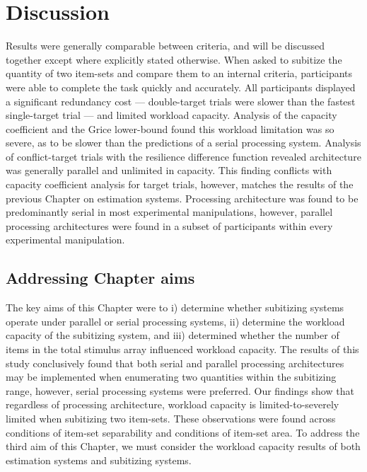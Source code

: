 \section{Discussion}
Results were generally comparable between criteria, and will be discussed together except where explicitly stated otherwise. When asked to subitize the quantity of two item-sets and compare them to an internal criteria, participants were able to complete the task quickly and accurately. All participants displayed a significant redundancy cost --- double-target trials were slower than the fastest single-target trial --- and limited workload capacity. Analysis of the capacity coefficient and the Grice lower-bound found this workload limitation was so severe, as to be slower than the predictions of a serial processing system. Analysis of conflict-target trials with the resilience difference function revealed architecture was generally parallel and unlimited in capacity. This finding conflicts with capacity coefficient analysis for target trials, however, matches the results of the previous Chapter on estimation systems. Processing architecture was found to be predominantly serial in most experimental manipulations, however, parallel processing architectures were found in a subset of participants within every experimental manipulation.


\subsection{Addressing Chapter aims}
The key aims of this Chapter were to i) determine whether subitizing systems operate under parallel or serial processing systems, ii) determine the workload capacity of the subitizing system, and iii) determined whether the number of items in the total stimulus array influenced workload capacity. The results of this study conclusively found that both serial and parallel processing architectures may be implemented when enumerating two quantities within the subitizing range, however, serial processing systems were preferred. Our findings show that regardless of processing architecture, workload capacity is limited-to-severely limited when subitizing two item-sets. These observations were found across conditions of item-set separability and conditions of item-set area. To address the third aim of this Chapter, we must consider the workload capacity results of both estimation systems and subitizing systems. 

